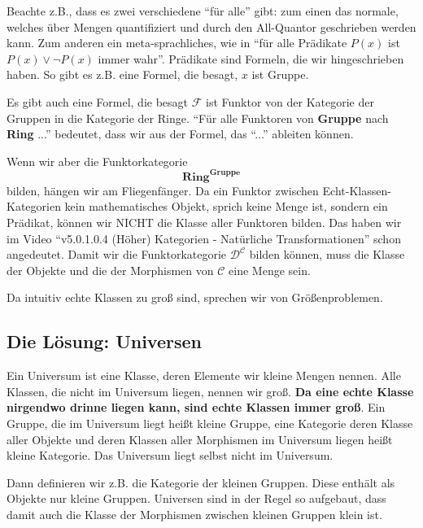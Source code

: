 \documentclass[a4paper]{amsart}
\theoremstyle{definition}
\newcommand{\CC}{\ensuremath{\mathcal{ C }}}
\newcommand{\DD}{\ensuremath{\mathcal{ D }}}
\newcommand{\FF}{\ensuremath{\mathcal{ F }}}
\begin{document}
Beachte z.B., dass es zwei verschiedene "`für alle"' gibt: zum einen das normale, welches über Mengen quantifiziert und durch den All-Quantor geschrieben werden kann. Zum anderen ein meta-sprachliches, wie in "`für alle Prädikate $P(x)$ ist $P(x) \lor \neg P(x)$ immer wahr"'. Prädikate sind Formeln, die wir hingeschrieben haben. So gibt es z.B. eine Formel, die besagt, $x$ ist Gruppe.

Es gibt auch eine Formel, die besagt $\FF$ ist Funktor von der Kategorie der Gruppen in die Kategorie der Ringe. "`Für alle Funktoren von \textbf{Gruppe} nach \textbf{Ring} ..."' bedeutet, dass wir aus der Formel, das "`..."' ableiten können.

Wenn wir aber die Funktorkategorie
\begin{equation}
    \mathbf{Ring}^\mathbf{Gruppe}
\end{equation}
bilden, hängen wir am Fliegenfänger. Da ein Funktor zwischen Echt-Klassen-Kategorien kein mathematisches Objekt, sprich keine Menge ist, sondern ein Prädikat, können wir NICHT die Klasse aller Funktoren bilden. Das haben wir im Video "`v5.0.1.0.4 (Höher) Kategorien - Natürliche Transformationen"' schon angedeutet.
Damit wir die Funktorkategorie $\DD^\CC$ bilden können, muss die Klasse der Objekte und die der Morphismen von $\CC$ eine Menge sein.

Da intuitiv echte Klassen zu groß sind, sprechen wir von Größenproblemen.

\subsection{Die Lösung: Universen}
Ein Universum ist eine Klasse, deren Elemente wir kleine Mengen nennen. Alle Klassen, die nicht im Universum liegen, nennen wir groß. \textbf{Da eine echte Klasse nirgendwo drinne liegen kann, sind echte Klassen immer groß}. Ein Gruppe, die im Universum liegt heißt kleine Gruppe, eine Kategorie deren Klasse aller Objekte und deren Klassen aller Morphismen im Universum liegen heißt kleine Kategorie. Das Universum liegt selbst nicht im Universum.

Dann definieren wir z.B. die Kategorie der kleinen Gruppen. Diese enthält als Objekte nur kleine Gruppen. Universen sind in der Regel so aufgebaut, dass damit auch die Klasse der Morphismen zwischen kleinen Gruppen klein ist.
\end{document}

